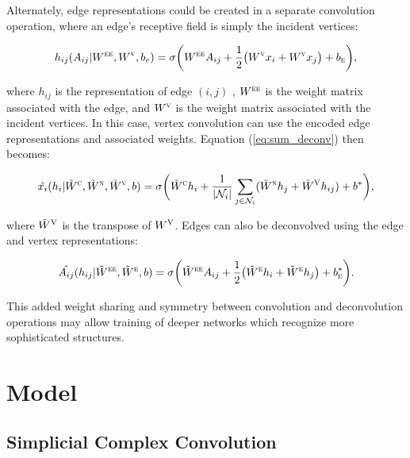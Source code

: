Alternately, edge representations could be created in a separate convolution operation, where an edge's receptive field is simply the incident vertices:

\begin{equation}
h_{ij}(A_{ij} |W^{\textsc{ee}}, W^{\textsc{v}}, b_e) = \sigma\bigg( W^{\textsc{ee}} A_{ij} + \frac{1}{2}\big(
W^{\textsc{v}} x_i + W^{\textsc{v}} x_j \big) + b_\textsc{e} \bigg),
\label{eq:edge_conv}
\end{equation}

\noindent
where $h_{ij}$ is the representation of edge $(i, j)$ , $W^{\textsc{ee}}$ is the weight matrix associated with the edge, and $W^{\textsc{v}}$ is the weight matrix associated with the incident vertices.
In this case, vertex convolution can use the encoded edge representations and associated weights.
Equation (\ref{eq:sum_deconv}) then becomes:

\begin{equation}
\hat{x_i}(h_i | \tilde{W}^\textsc{c}, \tilde{W}^\textsc{n}, \tilde{W}^\textsc{v}, b) = \sigma \bigg( \tilde{W}^{\textsc{c}} h_i + \frac{1}{|\mathcal{N}_i|}\sum_{j \in \mathcal{N}_i} (\tilde{W}^{\textsc{n}} h_j + \tilde{W}^{\textsc{V}} h_{ij}) + b^* \bigg),
\label{eq:sum_deconv2}
\end{equation}

\noindent
where $\tilde{W}^{\textsc{V}}$ is the transpose of $W^{\textsc{V}}$.
Edges can also be deconvolved using the edge and vertex representations:

\begin{equation}
\hat{A_{ij}}(h_{ij} |\tilde{W}^{\textsc{ee}}, \tilde{W}^{\textsc{e}}, b) = \sigma \bigg( \tilde{W}^{\textsc{ee}} A_{ij} + \frac{1}{2}\big(
\tilde{W}^{\textsc{e}} h_i + \tilde{W}^{\textsc{e}} h_j \big) + b^{*}_\textsc{e} \bigg).
\label{eq:edge_conv}
\end{equation}

\noindent
This added weight sharing and symmetry between convolution and deconvolution operations may allow training of deeper networks which recognize more sophisticated structures.




\section{Model}

\subsection{Simplicial Complex Convolution}

